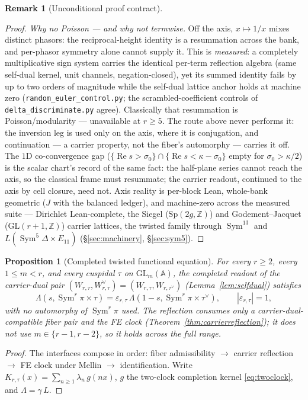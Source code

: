 \documentclass[11pt]{article}
\newtheorem{proposition}[theorem]{Proposition}
\theoremstyle{definition}
\newtheorem{remark}[theorem]{Remark}
\renewcommand{\Re}{\operatorname{Re}}
\newcommand{\Sym}{\operatorname{Sym}}
\begin{document}
\begin{remark}[Unconditional proof contract]
\begin{enumerate}
\begin{proof}
\emph{Why no Poisson --- and why not termwise.} Off the axis, $x\mapsto1/x$ mixes distinct phasors: the
reciprocal-height identity is a resummation across the bank, and per-phasor symmetry alone cannot supply it.
This is \emph{measured}: a completely multiplicative sign system carries the identical per-term reflection
algebra (same self-dual kernel, unit channels, negation-closed), yet its summed identity fails by up to two
orders of magnitude while the self-dual lattice anchor holds at machine zero
(\texttt{random\_euler\_control.py}; the scrambled-coefficient controls of \texttt{delta\_discriminate.py}
agree). Classically that resummation is Poisson/modularity --- unavailable at $r\ge5$. The route above never
performs it: the inversion leg is used only on the axis, where it is conjugation, and continuation --- a
carrier property, not the fiber's automorphy --- carries it off. The $1$D co-convergence gap
($\{\Re s>\sigma_0\}\cap\{\Re s<\kappa-\sigma_0\}$ empty for $\sigma_0>\kappa/2$) is the scalar chart's record
of the same fact: the half-plane series cannot reach the axis, so the classical frame must resummate; the
carrier readout, continued to the axis by cell closure, need not. Axis reality is per-block Lean, whole-bank
geometric ($J$ with the balanced ledger), and machine-zero across the measured suite --- Dirichlet
Lean-complete, the Siegel ($\mathrm{Sp}(2g,\mathbb Z)$) and Godement--Jacquet
($\mathrm{GL}(r{+}1,\mathbb Z)$) carrier lattices, the twisted family through $\Sym^{13}$ and
$L(\Sym^5\Delta\times E_{11})$ (\S\ref{sec:machinery}, \S\ref{sec:sym5}).
\end{proof}

\begin{proposition}[Completed twisted functional equation]\label{prop:completedFE}
For every $r\ge2$, every $1\le m<r$, and every cuspidal $\tau$ on $\mathrm{GL}_m(\mathbb A)$, the completed
readout of the carrier-dual pair $(W_{r,\tau},W_{r,\tau}^\vee)=(W_{r,\tau},W_{r,\tau^\vee})$
(Lemma~\ref{lem:selfdual}) satisfies
\[
  \Lambda(s,\Sym^r\pi\times\tau)=\varepsilon_{r,\tau}\,\Lambda(1-s,\Sym^r\pi\times\tau^\vee),
  \qquad |\varepsilon_{r,\tau}|=1,
\]
with no automorphy of $\Sym^r\pi$ used. The reflection consumes only a carrier-dual-compatible fiber pair and
the FE clock (Theorem~\ref{thm:carrierreflection}); it does not use $m\in\{r-1,r-2\}$, so it holds across the
full range.
\end{proposition}

\begin{proof}
The interfaces compose in order: fiber admissibility $\to$ carrier reflection $\to$ FE clock under Mellin
$\to$ identification. Write $K_{r,\tau}(x)=\sum_{n\ge1}\lambda_n\,g(nx)$, $g$ the two-clock completion
kernel \eqref{eq:twoclock}, and $\Lambda=\gamma\,L$.


\end{proof}
\end{enumerate}
\end{remark}
\end{document}
